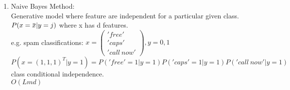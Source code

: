 \documentclass[12pt]{article}
\newcommand{\overbar}[1]{\mkern 1.5mu\overline{\mkern-1.5mu#1\mkern-1.5mu}\mkern 1.5mu}
\begin{document}
\begin{enumerate}
            \item Naive Bayes Method:\\
            Generative model where feature are independent for a particular given class.\\
            $P(x = \overbar{x} | y = j)$ where x has d features.\\
            e.g. spam classifications: $ x = \begin{pmatrix}
                'free' \\ 'caps' \\ 'call \ now'
            \end{pmatrix}, y = 0,1$\\
            $P(x = (1,1,1)^T | y = 1) = P('free' = 1 | y = 1)P('caps' = 1| y = 1)P('call \ now' | y = 1)$\\
            class conditional independence.\\
            $O(Lmd)$
        \end{enumerate}
\end{document}
